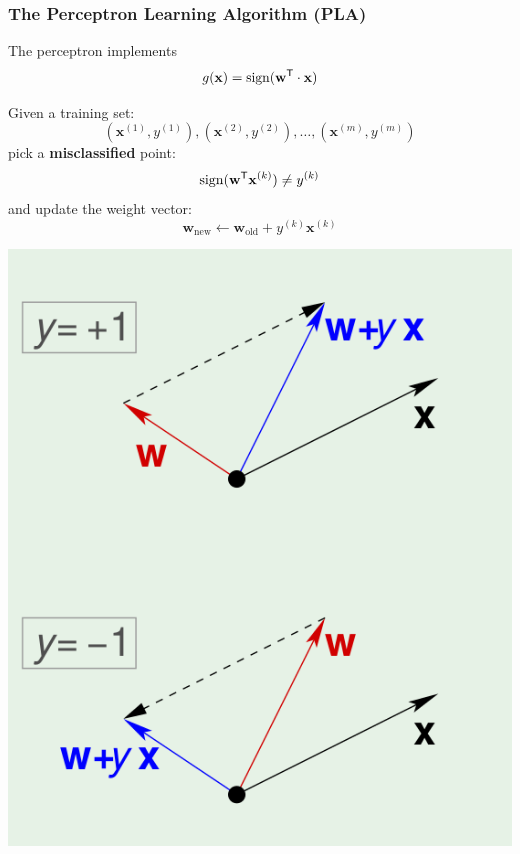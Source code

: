 \documentclass[xcolor=table]{beamer}
\newcommand{\vect}[1]{\ensuremath{\mathbf{#1}}}
\newcommand{\trans}[1]{\ensuremath{#1}^{\scriptsize{\textsf{T}}}}
\DeclareMathOperator{\sign}{sign}
\begin{document}
\begin{frame}[t]
\frametitle{The Perceptron Learning Algorithm (PLA)}
The perceptron implements 
\[g(\vect{x}) = \sign(\trans{\vect{w}} \cdot \vect{x})\]

\parbox[t]{5cm}{
Given a training set: 
\[(\vect{x}^{(1)}, y^{(1)}), (\vect{x}^{(2)}, y^{(2)}), \ldots, (\vect{x}^{(m)},
y^{(m)})\]
pick a \textbf{misclassified} point:
\[
    \sign (\trans{\vect{w}} \vect{x}^{(k)}) \neq y^{(k)}
\]
and update the weight vector:
\[
    \vect{w}_{\text{new}} \leftarrow \vect{w}_{\text{old}} + y^{(k)} \vect{x}^{(k)}
\]
} 
\hfill
\parbox[t]{5cm}{
\begin{center}
    \includegraphics[scale=0.20]{PLA.png}
\end{center}
}
\end{frame}
\end{document}
